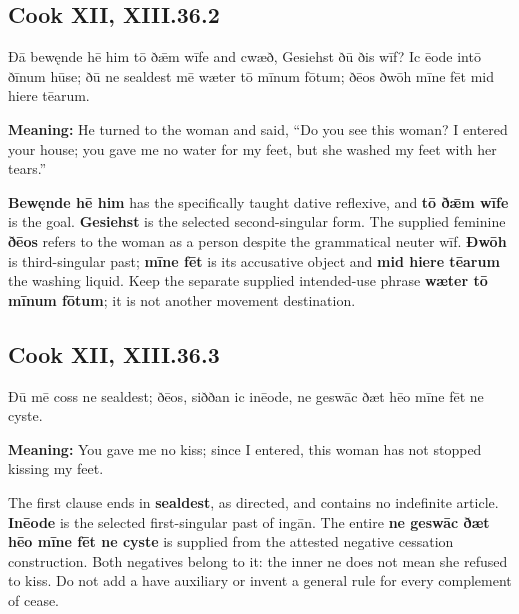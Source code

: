 \par\begin{minipage}{\linewidth}\raggedright
\subsection*{Cook XII, XIII.36.2}

Ðā bewęnde hē him tō ðǣm wīfe and cwæð, Gesiehst ðū ðis wīf? Ic ēode intō ðīnum hūse; ðū ne sealdest mē wæter tō mīnum fōtum; ðēos ðwōh mīne fēt mid hiere tēarum.

\textbf{Meaning:} He turned to the woman and said, “Do you see this woman? I entered your house; you gave me no water for my feet, but she washed my feet with her tears.”

\textbf{Bewęnde hē him} has the specifically taught dative reflexive, and \textbf{tō ðǣm wīfe} is the goal. \textbf{Gesiehst} is the selected second-singular form. The supplied feminine \textbf{ðēos} refers to the woman as a person despite the grammatical neuter wīf. \textbf{Ðwōh} is third-singular past; \textbf{mīne fēt} is its accusative object and \textbf{mid hiere tēarum} the washing liquid. Keep the separate supplied intended-use phrase \textbf{wæter tō mīnum fōtum}; it is not another movement destination.

\end{minipage}\par\addvspace{4pt}

\par\begin{minipage}{\linewidth}\raggedright
\subsection*{Cook XII, XIII.36.3}

Ðū mē coss ne sealdest; ðēos, siððan ic inēode, ne geswāc ðæt hēo mīne fēt ne cyste.

\textbf{Meaning:} You gave me no kiss; since I entered, this woman has not stopped kissing my feet.

The first clause ends in \textbf{sealdest}, as directed, and contains no indefinite article. \textbf{Inēode} is the selected first-singular past of ingān. The entire \textbf{ne geswāc ðæt hēo mīne fēt ne cyste} is supplied from the attested negative cessation construction. Both negatives belong to it: the inner ne does not mean she refused to kiss. Do not add a have auxiliary or invent a general rule for every complement of cease.

\end{minipage}\par\addvspace{4pt}

